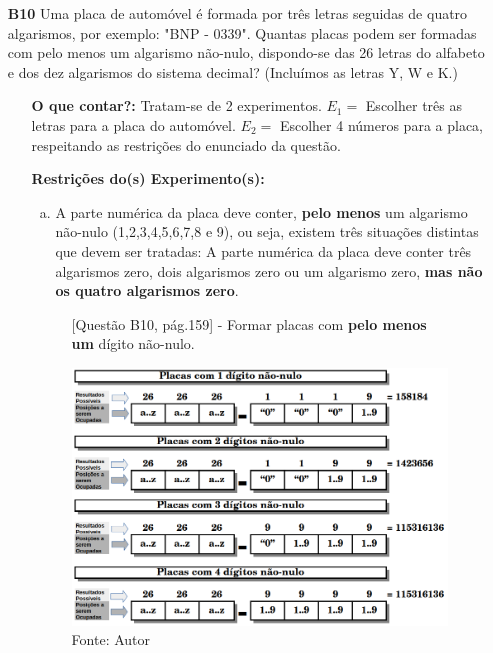 \documentclass[a4paper,12pt]{article}
\begin{document}
\begin{enumerate}
\item[\textbf{B10}] Uma placa de automóvel é formada por três letras seguidas de quatro algarismos, por exemplo: "BNP - 0339". Quantas placas podem ser formadas com pelo menos um algarismo não-nulo, dispondo-se das 26 letras do alfabeto e dos dez algarismos do sistema decimal? (Incluímos as letras Y, W e K.) 
  \begin{itemize}
    \item[\ding{172}] \textbf{O que contar?:} Tratam-se de 2 experimentos. $E_1 =$ Escolher três as letras para a placa do automóvel. $E_2 =$ Escolher 4 números para a placa, respeitando as restrições do enunciado da questão.
    \item[\ding{173}] \textbf{Restrições do(s) Experimento(s):}
        \begin{enumerate}[a)]
          \item A parte numérica da placa deve conter, \textbf{pelo menos} um algarismo não-nulo (1,2,3,4,5,6,7,8 e 9), ou seja, existem três situações distintas que devem ser tratadas: A parte numérica da placa deve conter três algarismos zero, dois algarismos zero ou um algarismo zero, \textbf{mas não os quatro algarismos zero}.
        \end{enumerate}  
   \begin{figure}[!htb]
      \centering
      \caption{[Questão B10, pág.159] - Formar placas com \textbf{pelo menos um} dígito não-nulo.}
      \includegraphics[scale=0.5]{../../imagens/cap21-exercicios-B10-pag159.png}
      \caption*{Fonte: Autor}
      \label{cap21-exercicios-10-pag159}
    \end{figure}
    
  \end{itemize}
  

\end{enumerate}
\end{document}
